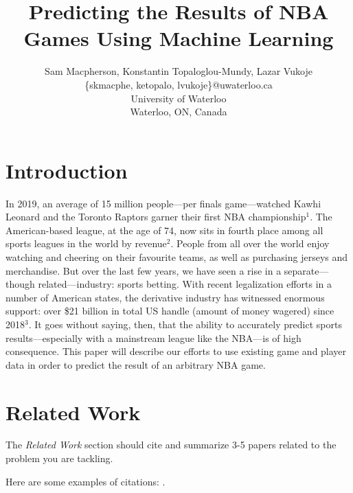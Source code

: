 \documentclass[letterpaper]{article} %
\begin{document}
%
\title{Predicting the Results of NBA Games Using Machine Learning}
\author{Sam Macpherson, Konstantin Topaloglou-Mundy, Lazar Vukoje\\
\{skmacphe, ketopalo, lvukoje\}@uwaterloo.ca\\
University of Waterloo\\
Waterloo, ON, Canada\\
}
\maketitle



\section{Introduction}

In 2019, an average of 15 million people---per finals game---watched Kawhi Leonard and the Toronto Raptors garner their first NBA championship$^1$. The American-based league, at the age of 74, now sits in fourth place among all sports leagues in the world by revenue$^2$. People from all over the world enjoy watching and cheering on their favourite teams, as well as purchasing jerseys and merchandise. But over the last few years, we have seen a rise in a separate---though related---industry: sports betting. With recent legalization efforts in a number of American states, the derivative industry has witnessed enormous support: over \$21 billion in total US handle (amount of money wagered) since 2018$^3$. It goes without saying, then, that the ability to accurately predict sports results---especially with a mainstream league like the NBA---is of high consequence. This paper will describe our efforts to use existing game and player data in order to predict the result of an arbitrary NBA game.


\section{Related Work}

The {\it Related Work} section should cite and summarize 3-5 papers related to the problem you are tackling.   

Here are some examples of citations: \cite{russell2016artificial,gao2016incentivizing,gao2014trick}.  
\end{document}
